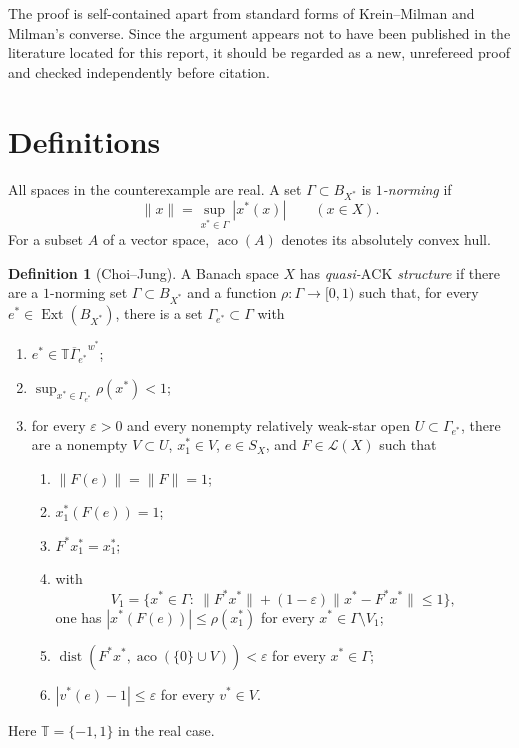 \documentclass[11pt]{article}
\theoremstyle{definition}
\newtheorem{definition}[theorem]{Definition}
\newcommand{\T}{\mathbb T}
\newcommand{\Ext}{\operatorname{Ext}}
\newcommand{\aco}{\operatorname{aco}}
\newcommand{\dist}{\operatorname{dist}}
\newcommand{\Lin}{\mathcal L}
\newcommand{\eps}{\varepsilon}
\newcommand{\ACK}{\mathrm{ACK}}
\begin{document}
The proof is self-contained apart from standard forms of Krein--Milman and
Milman's converse.  Since the argument appears not to have been published in
the literature located for this report, it should be regarded as a new,
unrefereed proof and checked independently before citation.

\section{Definitions}

All spaces in the counterexample are real.  A set $\Gamma\subset B_{X^*}$
is \emph{$1$-norming} if
\[
   \|x\|=\sup_{x^*\in\Gamma}|x^*(x)|\qquad(x\in X).
\]
For a subset $A$ of a vector space, $\aco(A)$ denotes its absolutely convex
hull.

\begin{definition}[Choi--Jung]\label{def:qack}
A Banach space $X$ has \emph{quasi-$\ACK$ structure} if there are a
$1$-norming set $\Gamma\subset B_{X^*}$ and a function
$\rho:\Gamma\to[0,1)$ such that, for every
$e^*\in\Ext(B_{X^*})$, there is a set $\Gamma_{e^*}\subset\Gamma$ with
\begin{enumerate}[label=\textup{(\roman*)},leftmargin=2.2em]
\item $e^*\in\overline{\T\Gamma_{e^*}}^{w^*}$;
\item $\sup_{x^*\in\Gamma_{e^*}}\rho(x^*)<1$;
\item for every $\eps>0$ and every nonempty relatively weak-star open
      $U\subset\Gamma_{e^*}$, there are a nonempty $V\subset U$,
      $x_1^*\in V$, $e\in S_X$, and $F\in\Lin(X)$ such that
      \begin{enumerate}[label=\textup{(\roman*)$'$},leftmargin=2.6em]
      \item $\|F(e)\|=\|F\|=1$;
      \item $x_1^*(F(e))=1$;
      \item $F^*x_1^*=x_1^*$;
      \item with
      \[
      V_1=\bigl\{x^*\in\Gamma:\
      \|F^*x^*\|+(1-\eps)\|x^*-F^*x^*\|\le1\bigr\},
      \]
      one has $|x^*(F(e))|\le\rho(x_1^*)$ for every
      $x^*\in\Gamma\setminus V_1$;
      \item $\dist(F^*x^*,\aco(\{0\}\cup V))<\eps$ for every
      $x^*\in\Gamma$;
      \item $|v^*(e)-1|\le\eps$ for every $v^*\in V$.
      \end{enumerate}
\end{enumerate}
Here $\T=\{-1,1\}$ in the real case.
\end{definition}
\end{document}
